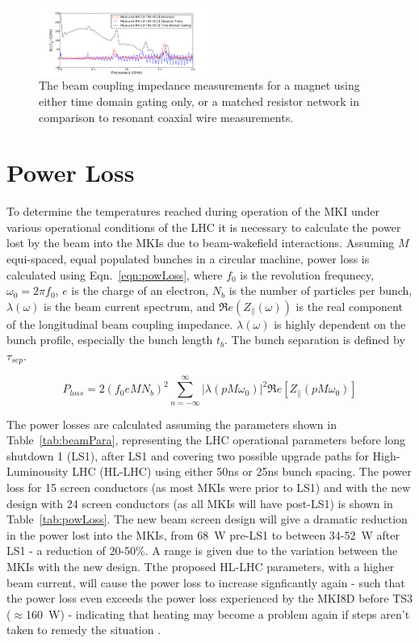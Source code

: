 \documentclass[a4paper,
              ]{jacow}
\begin{document}
\begin{figure}
\includegraphics[width=0.5\textwidth]{TUPRI030f5.pdf}
\caption{The beam coupling impedance measurements for a magnet using either time domain gating only, or a matched resistor network in comparison to resonant coaxial wire measurements.}
\label{fig:measComp}
\end{figure}

\section{Power Loss}

To determine the temperatures reached during operation of the MKI under various operational conditions of the LHC it is necessary to calculate the power lost by the beam into the MKIs due to beam-wakefield interactions. Assuming $M$ equi-spaced, equal populated bunches in a circular machine, power loss is calculated using Eqn.~\ref{eqn:powLoss}, where $f_{0}$ is the revolution frequnecy, $\omega_{0}=2\pi f_{0}$, $e$ is the charge of an electron, $N_{b}$ is the number of particles per bunch, $\lambda(\omega)$ is the beam current spectrum, and $\Re{}e(Z_{\parallel}(\omega))$ is the real component of the longitudinal beam coupling impedance. $\lambda(\omega)$ is highly dependent on the bunch profile, especially the bunch length $t_{b}$. The bunch separation is defined by $\tau_{sep}$.

\begin{equation}
P_{loss} = 2 \left( f_{0} e M  N_{b}\right)^{2} \displaystyle\sum\limits_{n = -\infty}^{\infty}  \left| \lambda \left( p M \omega_{0} \right)  \right|^{2} \Re{}e \left[ Z_{\parallel} \left( p M \omega_{0} \right) \right]
\label{eqn:powLoss}
\end{equation}

The power losses are calculated assuming the parameters shown in Table~\ref{tab:beamPara}, representing the LHC operational parameters before long shutdown 1 (LS1), after LS1 and covering two possible upgrade paths for High-Luminousity LHC (HL-LHC) using either 50ns or 25ns bunch spacing. The power loss for 15 screen conductors (as most MKIs were prior to LS1) and with the new design with 24 screen conductors (as all MKIs will have post-LS1) is shown in Table~\ref{tab:powLoss}. The new beam screen design will give a dramatic reduction in the power lost into the MKIs, from 68~W pre-LS1 to between 34-52~W after LS1 - a reduction of 20-50\%. A range is given due to the variation between the MKIs with the new design. Tthe proposed HL-LHC parameters, with a higher beam current, will cause the power loss to increase signficantly again - such that the power loss even exceeds the power loss experienced by the MKI8D before TS3 ($\approx$160~W) - indicating that heating may become a problem again if steps aren't taken to remedy the situation \cite{mkiCoolling}.
\end{document}

